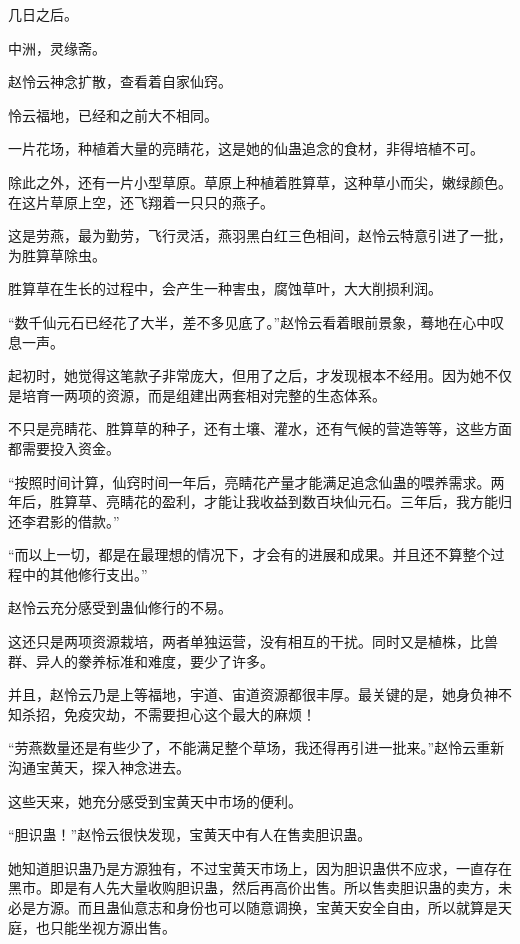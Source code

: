 
\begin{this_body}

几日之后。

中洲，灵缘斋。

赵怜云神念扩散，查看着自家仙窍。

怜云福地，已经和之前大不相同。

一片花场，种植着大量的亮睛花，这是她的仙蛊追念的食材，非得培植不可。

除此之外，还有一片小型草原。草原上种植着胜算草，这种草小而尖，嫩绿颜色。在这片草原上空，还飞翔着一只只的燕子。

这是劳燕，最为勤劳，飞行灵活，燕羽黑白红三色相间，赵怜云特意引进了一批，为胜算草除虫。

胜算草在生长的过程中，会产生一种害虫，腐蚀草叶，大大削损利润。

“数千仙元石已经花了大半，差不多见底了。”赵怜云看着眼前景象，蓦地在心中叹息一声。

起初时，她觉得这笔款子非常庞大，但用了之后，才发现根本不经用。因为她不仅是培育一两项的资源，而是组建出两套相对完整的生态体系。

不只是亮睛花、胜算草的种子，还有土壤、灌水，还有气候的营造等等，这些方面都需要投入资金。

“按照时间计算，仙窍时间一年后，亮睛花产量才能满足追念仙蛊的喂养需求。两年后，胜算草、亮睛花的盈利，才能让我收益到数百块仙元石。三年后，我方能归还李君影的借款。”

“而以上一切，都是在最理想的情况下，才会有的进展和成果。并且还不算整个过程中的其他修行支出。”

赵怜云充分感受到蛊仙修行的不易。

这还只是两项资源栽培，两者单独运营，没有相互的干扰。同时又是植株，比兽群、异人的豢养标准和难度，要少了许多。

并且，赵怜云乃是上等福地，宇道、宙道资源都很丰厚。最关键的是，她身负神不知杀招，免疫灾劫，不需要担心这个最大的麻烦！

“劳燕数量还是有些少了，不能满足整个草场，我还得再引进一批来。”赵怜云重新沟通宝黄天，探入神念进去。

这些天来，她充分感受到宝黄天中市场的便利。

“胆识蛊！”赵怜云很快发现，宝黄天中有人在售卖胆识蛊。

她知道胆识蛊乃是方源独有，不过宝黄天市场上，因为胆识蛊供不应求，一直存在黑市。即是有人先大量收购胆识蛊，然后再高价出售。所以售卖胆识蛊的卖方，未必是方源。而且蛊仙意志和身份也可以随意调换，宝黄天安全自由，所以就算是天庭，也只能坐视方源出售。


\end{this_body}
